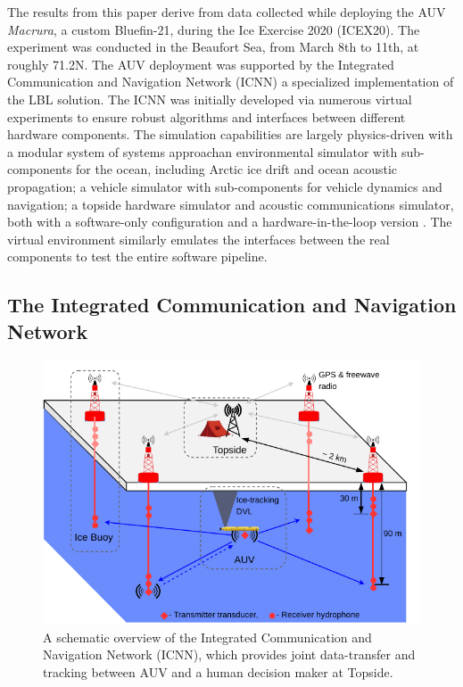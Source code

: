 The results from this paper derive from data collected while deploying the AUV \emph{Macrura}, a custom Bluefin-21, during the Ice Exercise 2020 (ICEX20).
The experiment was conducted in the Beaufort Sea, from March 8th to 11th, at roughly 71.2\textdegree N.
The AUV deployment was supported by the Integrated Communication and Navigation Network (ICNN) \citep{schneider_self-adapting_2020,Randeni2020,randeni_high-resolution_2021} a specialized implementation of the LBL solution.
The ICNN was initially developed via numerous virtual experiments to ensure robust algorithms and interfaces between different hardware components. 
The simulation capabilities are largely physics-driven with a modular system of systems approach\textemdash an environmental simulator with sub-components for the ocean, including Arctic ice drift and ocean acoustic propagation; a vehicle simulator with sub-components for vehicle dynamics and navigation; a topside hardware simulator and acoustic communications simulator, both with a software-only configuration and a hardware-in-the-loop version \citep{schneider_netsim_2018}.
The virtual environment similarly emulates the interfaces between the real components to test the entire software pipeline.

\subsection{The Integrated Communication and Navigation Network}

\begin{figure}[h!]
	\centering
	\includegraphics[width=0.8\columnwidth]{figs/Fig2.pdf}
	\caption{A schematic overview of the Integrated Communication and Navigation Network (ICNN), which provides joint data-transfer and tracking between AUV and a human decision maker at Topside.}
	\label{fig:icnnOverview}
\end{figure}

